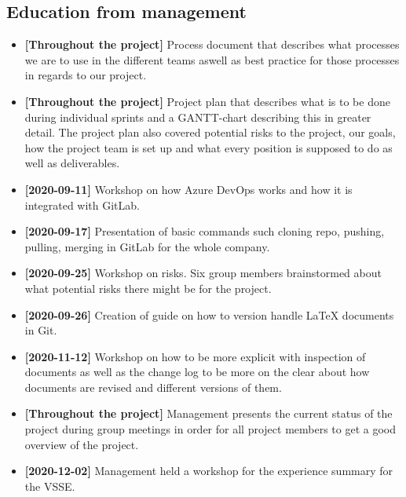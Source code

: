 \subsection{Education from management}
\begin{itemize}
\item \textbf{[Throughout the project]} Process document that describes what processes we are to use in the different teams aswell as best practice for those processes in regards to our project. 
\item \textbf{[Throughout the project]} Project plan that describes what is to be done during individual sprints and a GANTT-chart describing this in greater detail. The project plan also covered potential risks to the project, our goals, how the project team is set up and what every position is supposed to do as well as deliverables. 
 \item \textbf{[2020-09-11]} Workshop on how Azure DevOps works and how it is integrated with GitLab.
    \item \textbf{[2020-09-17]} Presentation of basic commands such cloning repo, pushing, pulling, merging in GitLab for the whole company. 
        \item \textbf{[2020-09-25]} Workshop on risks. Six group members brainstormed about what potential risks there might be for the project.

    \item \textbf{[2020-09-26]} Creation of guide on how to version handle LaTeX documents in Git.
    \item \textbf{[2020-11-12]} Workshop on how to be more explicit with inspection of documents as well as the change log to be more on the clear about how documents are revised and different versions of them. 
    \item \textbf{[Throughout the project]} Management presents the current status of the project during group meetings in order for all project members to get a good overview of the project.
    \item \textbf{[2020-12-02]} Management held a workshop for the experience summary for the VSSE. 
\end{itemize}
